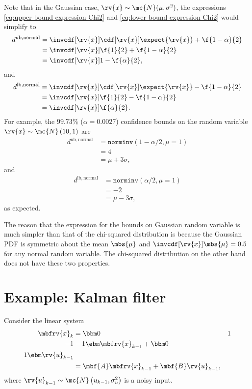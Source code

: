 \documentclass{simple-article}
\begin{document}
\begin{blueBox}
  Note that in the Gaussian case, $\rv{x}\sim\mc{N}(\mu, \sigma^{2})$, the expressions \eqref{eq:upper bound expression Chi2} and \eqref{eq:lower bound expression Chi2} would simplify to 
  \begin{align}
    d^{\mathrm{ub, normal}} 
            &= \invcdf[\rv{x}]{\cdf[\rv{x}]{\expect{\rv{x}}} + \f{1-\alpha}{2}}\\
            &= \invcdf[\rv{x}]{\f{1}{2} + \f{1-\alpha}{2}}\\
            &= \invcdf[\rv{x}]{1 - \f{\alpha}{2}},
  \end{align}
  and
  \begin{align}
    d^{\mathrm{lb, normal}} 
            &= \invcdf[\rv{x}]{\cdf[\rv{x}]{\expect{\rv{x}}} - \f{1-\alpha}{2}}\\
            &= \invcdf[\rv{x}]{\f{1}{2} - \f{1-\alpha}{2}}\\
            &= \invcdf[\rv{x}]{\f{\alpha}{2}}.
  \end{align}
  For example, the $99.73\%$ ($\alpha = 0.0027$) confidence bounds on the random variable $\rv{x}\sim\mc{N}\left( 10, 1 \right)$ are
  \begin{align}
    d^{\mathrm{ub, normal}} &= \texttt{norminv}\left( 1 - \alpha/2, \mu = 1 \right)\\
                            &= 4\\
                            &= \mu + 3\sigma,
  \end{align}
  and
  \begin{align}
    d^{\mathrm{lb, normal}} &= \texttt{norminv}\left(\alpha/2, \mu = 1 \right)\\
                            &= -2\\
                            &= \mu - 3\sigma,
  \end{align}
  as expected. 

  The reason that the expression for the bounds on Gaussian random variable is much simpler than that of the chi-squared distribution is because the Gaussian PDF is symmetric about the mean $\mbs{\mu}$ and $\invcdf[\rv{x}]{\mbs{\mu}}=0.5$ for any normal random variable. The chi-squared distribution on the other hand does not have these two properties. 
\end{blueBox}


\section{Example: Kalman filter}
Consider the linear system
\begin{align}
  \mbfrv{x}_{k} &= \bbm 0 & 1\\-1& -1 \ebm\mbfrv{x}_{k-1} + \bbm 0\\1 \ebm \rv{u}_{k-1}\\
                &= \mbf{A}\mbfrv{x}_{k-1} + \mbf{B}\rv{u}_{k-1},
\end{align}
where $\rv{u}_{k-1}\sim\mc{N}\left( u_{k-1}, \sigma_{u}^{2} \right)$ is a noisy input. 
\end{document}

